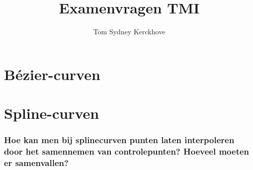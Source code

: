 \documentclass[12pt,a4paper]{article}
\author{Tom Sydney Kerckhove}
\title{Examenvragen TMI}
\begin{document}
\pagebreak





\part{B\'ezier-curven}



\iffalse
\section{Bespreek de variatieverminderingseigenschap.}
\section{Wat betekent de variatieverminderingseigenschap voor B\'ezier curven?}
\section{Wat betekent de variatieverminderingseigenschap voor splines?}
\section{Bespreek subdivisie en geef de methode.}
\section{Bespreek graadverhoding, geef het bewijs en leg uit waarvoor het dient.}
\section{Bespreek tensorproductoppervlakken aan de hand van B\'ezier-oppervlakken.}
\section{Bereken de tweede partiele afgeleide in de hoekpunten van een B\'ezier-oppervlak, leg uit en geef grafisch weer.}
\fi

\part{Spline-curven}


\iffalse
\section{Hoe kan men bij splinecurven punten laten interpoleren door het samennemen van controlepunten? Hoeveel moeten er samenvallen? }
\end{document}
